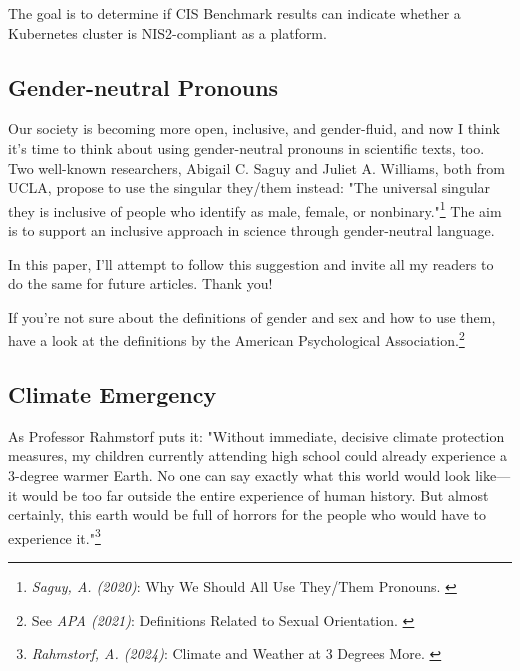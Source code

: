 The goal is to determine if CIS Benchmark results can indicate whether a Kubernetes cluster is NIS2-compliant as a platform.

\subsection{Gender-neutral Pronouns}

Our society is becoming more open, inclusive, and gender-fluid, and now I think it's time to think about using gender-neutral pronouns in scientific texts, too. Two well-known researchers, Abigail C. Saguy and Juliet A. Williams, both from UCLA, propose to use the singular they/them instead: "The universal singular they is inclusive of people who identify as male, female, or nonbinary."\footnote{\textit{Saguy, A. (2020)}: Why We Should All Use They/Them Pronouns. \cite{pronouns}} The aim is to support an inclusive approach in science through gender-neutral language. 

In this paper, I'll attempt to follow this suggestion and invite all my readers to do the same for future articles. Thank you!

If you're not sure about the definitions of gender and sex and how to use them, have a look at the definitions by the American Psychological Association.\footnote{See \textit{APA (2021)}: Definitions Related to Sexual Orientation. \cite{apaDefinitions}}

\subsection{Climate Emergency}

As Professor Rahmstorf puts it: "Without immediate, decisive climate protection measures, my children currently attending high school could already experience a 3-degree warmer Earth. No one can say exactly what this world would look like—it would be too far outside the entire experience of human history. But almost certainly, this earth would be full of horrors for the people who would have to experience it."\footnote{\textit{Rahmstorf, A. (2024)}: Climate and Weather at 3 Degrees More. \cite{3dgreesMore}}

